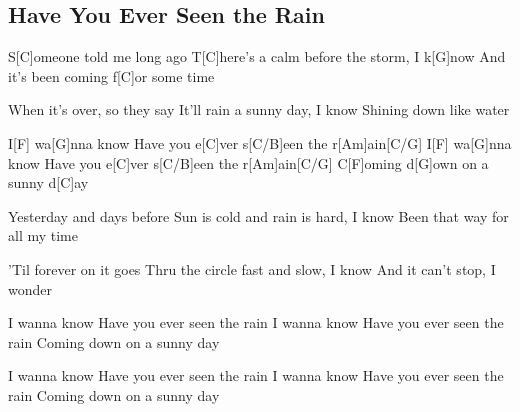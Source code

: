 \subsection*{Have You Ever Seen the Rain   }
\begin{guitar}
S[C]omeone told me long ago
T[C]here's a calm before the storm, I k[G]now
And it's been coming f[C]or some time



When it's over, so they say
It'll rain a sunny day, I know
Shining down like water



I[F]{} wa[G]nna know
Have you e[C]ver s[C/B]een the r[Am]ain[C/G]{}
I[F]{} wa[G]nna know
Have you e[C]ver s[C/B]een the r[Am]ain[C/G]{}
C[F]oming d[G]own on a sunny d[C]ay



Yesterday and days before
Sun is cold and rain is hard, I know
Been that way for all my time



'Til forever on it goes
Thru the circle fast and slow, I know
And it can't stop, I wonder



I wanna know
Have you ever seen the rain
I wanna know
Have you ever seen the rain
Coming down on a sunny day



I wanna know
Have you ever seen the rain
I wanna know
Have you ever seen the rain
Coming down on a sunny day
\end{guitar}
